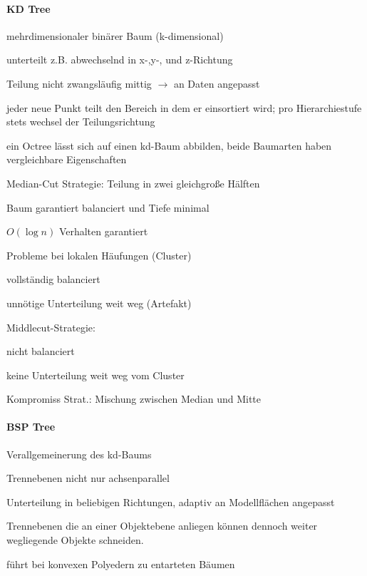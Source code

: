 \documentclass[landscape]{article}
\begin{document}
\begin{multicols}{3}
  \paragraph{KD Tree}
  \begin{itemize*}
    \item mehrdimensionaler binärer Baum (k-dimensional)
    \item unterteilt z.B. abwechselnd in x-,y-, und z-Richtung
    \item Teilung nicht zwangsläufig mittig $\rightarrow$ an Daten angepasst
    \item jeder neue Punkt teilt den Bereich in dem er einsortiert wird; pro Hierarchiestufe stets wechsel der Teilungsrichtung
    \item ein Octree lässt sich auf einen kd-Baum abbilden, beide Baumarten haben vergleichbare Eigenschaften
    \item Median-Cut Strategie: Teilung in zwei gleichgroße Hälften
          \begin{itemize*}
            \item Baum garantiert balanciert und Tiefe minimal
            \item $O(\log n)$ Verhalten garantiert
            \item Probleme bei lokalen Häufungen (Cluster)
            \item vollständig balanciert
            \item unnötige Unterteilung weit weg (Artefakt)
          \end{itemize*}
    \item Middlecut-Strategie:
          \begin{itemize*}
            \item nicht balanciert
            \item keine Unterteilung weit weg vom Cluster
          \end{itemize*}
    \item Kompromiss Strat.: Mischung zwischen Median und Mitte
  \end{itemize*}
  
  \paragraph{BSP Tree}
  \begin{itemize*}
    \item Verallgemeinerung des kd-Baums
    \item Trennebenen nicht nur achsenparallel
    \item Unterteilung in beliebigen Richtungen, adaptiv an Modellflächen angepasst
    \item Trennebenen die an einer Objektebene anliegen können dennoch weiter wegliegende Objekte schneiden.
    \item führt bei konvexen Polyedern zu entarteten Bäumen
  \end{itemize*}
  

\end{multicols}
\end{document}
